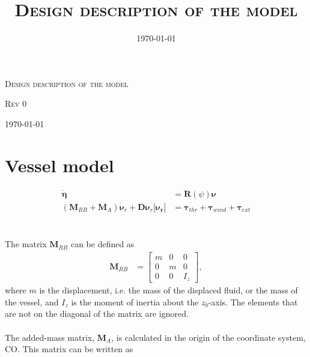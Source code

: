 \documentclass[a4paper]{article}
\title{\textsc{Design description of the model}}
\date{\today}
\begin{document}
\begin{titlepage}
	\centering
	{\scshape\LARGE Design description of the model \par}
	\vspace{1cm}
	{\scshape\Large Rev 0 \par}
	\vspace{2cm}
	\vfill

	{\large \today\par}
\end{titlepage}

\thispagestyle{empty}
\newpage

\setcounter{tocdepth}{3}
\tableofcontents
\setcounter{secnumdepth}{3}
\newpage

\section{Vessel model}

\begin{equation}
\label{eq:vessel_model}
\begin{aligned}
	\boldsymbol{\dot{\eta}} &= \boldsymbol{R} (\psi) \boldsymbol{\nu} \\
	(\boldsymbol{M}_{RB} + \boldsymbol{M}_A) \boldsymbol{\dot{\nu}}_r + \boldsymbol{D} \boldsymbol{\nu}_r |\boldsymbol{\nu_r}| &= \boldsymbol{\tau}_{thr} + \boldsymbol{\tau}_{wind} + \boldsymbol{\tau}_{ext}
\end{aligned}
\end{equation}
\\
\\
The matrix $\boldsymbol{M}_{RB}$ can be defined as
\begin{equation}
\label{eq:MRB_matrix}
\begin{aligned}
	\boldsymbol{M}_{RB} &=
		\left[ \begin{array}{ccc}
			m &  0 & 0 \\
			0 &  m & 0 \\
			0 &  0 &  I_z 
		\end{array} \right],
\end{aligned}
\end{equation}
%
where $m$ is the displacement, i.e. the mass of the displaced fluid, or the mass of the vessel, and $I_z$ is the moment of inertia about the $z_b$-axis. The elements that are not on
the diagonal of the matrix are ignored.
\\
\\
The added-mass matrix, $\boldsymbol{M}_A$, is calculated in the origin of the coordinate system, CO. This matrix can be written as
\end{document}
